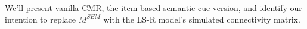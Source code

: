 We'll present vanilla CMR, the item-based semantic cue version, and identify our intention to replace $M^{SEM}$ with the LS-R model's simulated connectivity matrix.